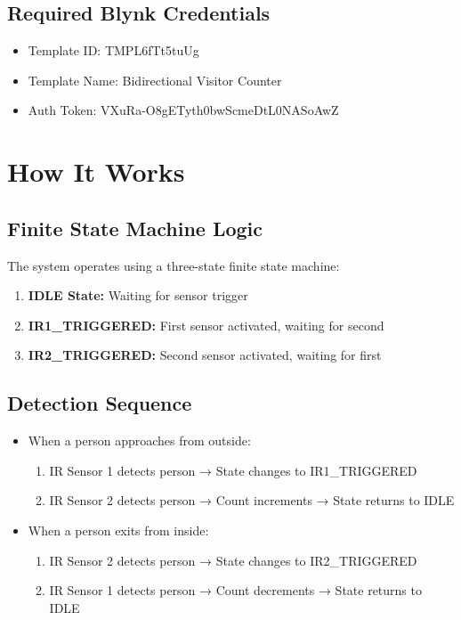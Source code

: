 \documentclass[12pt,a4paper]{article}
\begin{document}
\subsection{Required Blynk Credentials}
\begin{itemize}
  \item Template ID: TMPL6fTt5tuUg
  \item Template Name: Bidirectional Visitor Counter
  \item Auth Token: VXuRa-O8gETyth0bwScmeDtL0NASoAwZ
\end{itemize}

\section{How It Works}

\subsection{Finite State Machine Logic}
The system operates using a three-state finite state machine:

\begin{enumerate}
  \item \textbf{IDLE State:} Waiting for sensor trigger
  \item \textbf{IR1\_TRIGGERED:} First sensor activated, waiting for second
  \item \textbf{IR2\_TRIGGERED:} Second sensor activated, waiting for first
\end{enumerate}

\subsection{Detection Sequence}
\begin{itemize}
  \item When a person approaches from outside:
    \begin{enumerate}
      \item IR Sensor 1 detects person → State changes to IR1\_TRIGGERED
      \item IR Sensor 2 detects person → Count increments → State returns to IDLE
    \end{enumerate}
  \item When a person exits from inside:
    \begin{enumerate}
      \item IR Sensor 2 detects person → State changes to IR2\_TRIGGERED  
      \item IR Sensor 1 detects person → Count decrements → State returns to IDLE
    \end{enumerate}
\end{itemize}
\end{document}
